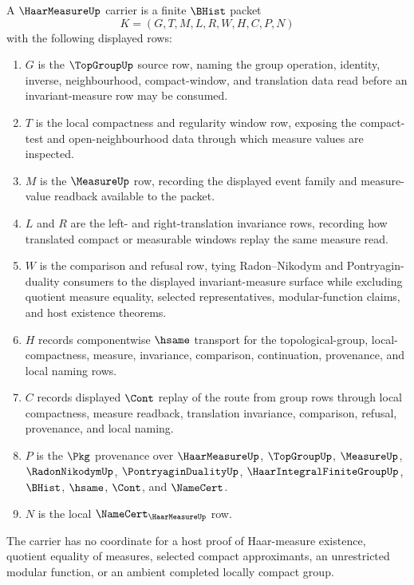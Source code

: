 \begin{definition}
\label{def:haar-measure-carrier}
A $\HaarMeasureUp$ carrier is a finite $\BHist$ packet
$$
K=(G,T,M,L,R,W,H,C,P,N)
$$
with the following displayed rows:
\begin{enumerate}
\item $G$ is the $\TopGroupUp$ source row, naming the group operation, identity, inverse, neighbourhood, compact-window, and translation data read before an invariant-measure row may be consumed.
\item $T$ is the local compactness and regularity window row, exposing the compact-test and open-neighbourhood data through which measure values are inspected.
\item $M$ is the $\MeasureUp$ row, recording the displayed event family and measure-value readback available to the packet.
\item $L$ and $R$ are the left- and right-translation invariance rows, recording how translated compact or measurable windows replay the same measure read.
\item $W$ is the comparison and refusal row, tying Radon--Nikodym and Pontryagin-duality consumers to the displayed invariant-measure surface while excluding quotient measure equality, selected representatives, modular-function claims, and host existence theorems.
\item $H$ records componentwise $\hsame$ transport for the topological-group, local-compactness, measure, invariance, comparison, continuation, provenance, and local naming rows.
\item $C$ records displayed $\Cont$ replay of the route from group rows through local compactness, measure readback, translation invariance, comparison, refusal, provenance, and local naming.
\item $P$ is the $\Pkg$ provenance over $\HaarMeasureUp$, $\TopGroupUp$, $\MeasureUp$, $\RadonNikodymUp$, $\PontryaginDualityUp$, $\HaarIntegralFiniteGroupUp$, $\BHist$, $\hsame$, $\Cont$, and $\NameCert$.
\item $N$ is the local $\NameCert_{\HaarMeasureUp}$ row.
\end{enumerate}
The carrier has no coordinate for a host proof of Haar-measure existence, quotient equality of measures, selected compact approximants, an unrestricted modular function, or an ambient completed locally compact group.
\end{definition}

